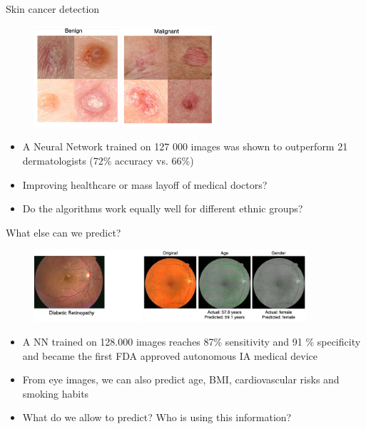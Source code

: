 \documentclass[xcolor=pdftex,dvipsnames,table]{beamer}
\begin{document}
\begin{frame}{Skin cancer detection}
\begin{figure}[htb]
\includegraphics[width=0.6\textwidth]{../graphics/dermatology.pdf}
\end{figure}
\begin{itemize}
\item<1-> A Neural Network trained on 127 000 images was shown to outperform 21 dermatologists (72\% accuracy vs. 66\%) \cite{Esteva2017}
\item<2-> Improving healthcare or mass layoff of medical doctors?
\item<3-> Do the algorithms work equally well for different ethnic groups?
\end{itemize}
\end{frame}

\begin{frame}{What else can we predict?}
\begin{figure}[htb]
\includegraphics[width=0.9\textwidth]{../graphics/retinopathy.pdf}
\end{figure}
\begin{itemize}
\item<1-> A NN trained on 128.000 images reaches 87\% sensitivity and 91 \% specificity and became the first FDA approved autonomous IA medical device \cite{Abramoff2018}
\item<2-> From eye images, we can also predict age, BMI, cardiovascular risks and smoking habits \cite{Poplin2018}
\item<3-> What do we allow to predict? Who is using this information?
\end{itemize}
\end{frame}
\end{document}
